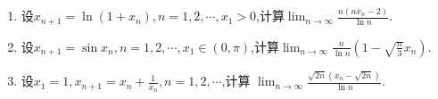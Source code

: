 \documentclass[lang=cn,newtx,10pt,scheme=chinese]{elegantbook}
\begin{document}
\begin{example}
   \begin{enumerate}
      \item 设\(x_{n + 1} = \ln(1 + x_n), n = 1, 2, \cdots, x_1 > 0\),计算\(\lim_{n \to \infty} \frac{n(nx_n - 2)}{\ln n}\).
   
      \item 设\(x_{n + 1} = \sin x_n, n = 1, 2, \cdots, x_1 \in (0, \pi)\),计算\(\lim_{n \to \infty} \frac{n}{\ln n}(1 - \sqrt{\frac{n}{3}}x_n)\).
      
      \item 设\(x_1 = 1, x_{n + 1} = x_n + \frac{1}{x_n}, n = 1, 2, \cdots\),计算
      \(\lim_{n \to \infty} \frac{\sqrt{2n}(x_n - \sqrt{2n})}{\ln n}\).
   \end{enumerate}
   \end{example}
\end{document}
